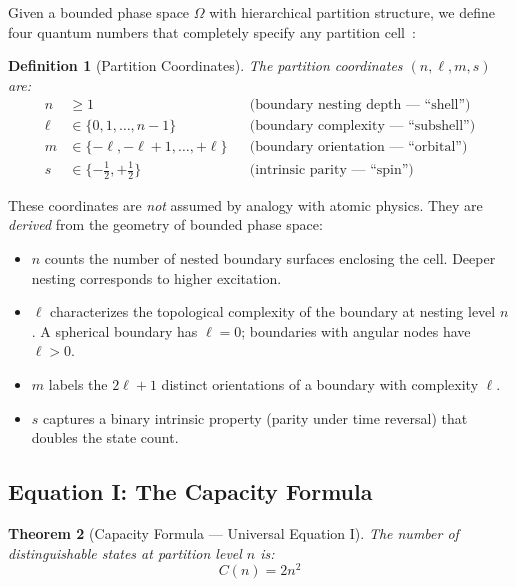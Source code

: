 \documentclass[aps,prx,superscriptaddress,twocolumn,10pt,a4paper,longbibliography,preprint]{revtex4-2}
\newtheorem{theorem}{Theorem}[section]
\newtheorem{defn}[theorem]{Definition}
\theoremstyle{definition}
\theoremstyle{remark}
\begin{document}
Given a bounded phase space $\Omega$ with hierarchical partition structure, we define four quantum numbers that completely specify any partition cell~\cite{Sachikonye2026a}:

\begin{defn}[Partition Coordinates]
\label{def:coords}
The partition coordinates $(n, \ell, m, s)$ are:
\begin{align}
n &\geq 1 & &\text{(boundary nesting depth --- ``shell'')} \label{eq:n_def} \\
\ell &\in \{0, 1, \ldots, n-1\} & &\text{(boundary complexity --- ``subshell'')} \label{eq:l_def} \\
m &\in \{-\ell, -\ell+1, \ldots, +\ell\} & &\text{(boundary orientation --- ``orbital'')} \label{eq:m_def} \\
s &\in \{-\tfrac{1}{2}, +\tfrac{1}{2}\} & &\text{(intrinsic parity --- ``spin'')} \label{eq:s_def}
\end{align}
\end{defn}

These coordinates are \emph{not} assumed by analogy with atomic physics. They are \emph{derived} from the geometry of bounded phase space:
\begin{itemize}
\item $n$ counts the number of nested boundary surfaces enclosing the cell. Deeper nesting corresponds to higher excitation.
\item $\ell$ characterizes the topological complexity of the boundary at nesting level $n$. A spherical boundary has $\ell = 0$; boundaries with angular nodes have $\ell > 0$.
\item $m$ labels the $2\ell + 1$ distinct orientations of a boundary with complexity $\ell$.
\item $s$ captures a binary intrinsic property (parity under time reversal) that doubles the state count.
\end{itemize}

\subsection{Equation I: The Capacity Formula}

\begin{theorem}[Capacity Formula --- Universal Equation I]
\label{thm:capacity}
The number of distinguishable states at partition level $n$ is:
\begin{equation}
\boxed{C(n) = 2n^2}
\label{eq:capacity}
\end{equation}
\end{theorem}
\end{document}
